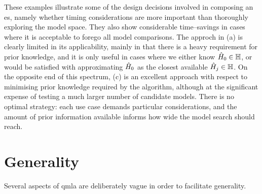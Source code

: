 These examples illustrate some of the design decisions involved in composing an \gls{es}, 
    namely whether timing considerations are more important than thoroughly exploring the model space.
They also show considerable time--savings in cases where it is
    acceptable to forego all model comparisons. 
The approch in (a) is clearly limited in its applicability, 
    mainly in that there is a heavy requirement for prior knowledge, 
    and it is only useful in cases where we either know $\hat{H}_0 \in \mathbb{H}$, 
    or would be satisfied with approximating $\hat{H}_0$ as the closest available $\hat{H}_j \in \mathbb{H}$. 
On the opposite end of this spectrum, (c) is an excellent approach
    with respect to minimising prior knowledge required by the algorithm, 
    although at the significant expense of testing a much larger number of candidate models. 
There is no optimal strategy:
    each use case demands particular considerations, 
    and the amount of prior information available informs how wide the model search should reach. 

\par 


\section{Generality}
Several aspects of \gls{qmla} are deliberately vague in order to facilitate generality. 

